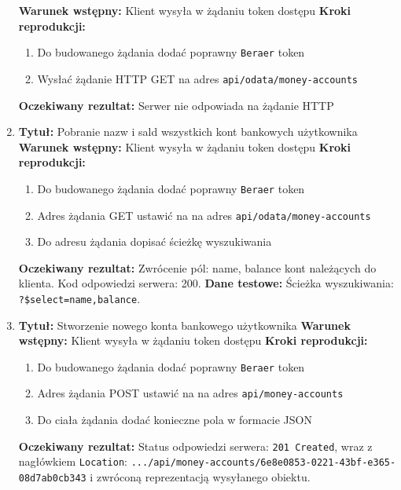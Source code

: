 \begin{enumerate}[labelwidth=1em,label=\Roman*]
    \textbf{Warunek wstępny:} Klient wysyła w żądaniu token dostępu \newline
    \textbf{Kroki reprodukcji:}  \begin{enumerate}[label=\arabic*.]
        \item Do budowanego żądania dodać poprawny \texttt{Beraer} token 
        \item Wysłać żądanie HTTP GET na adres \texttt{api/odata/money-accounts}
    \end{enumerate}
    \textbf{Oczekiwany rezultat:}  Serwer nie odpowiada na żądanie HTTP \newline
\item 
    \textbf{Tytuł:} Pobranie nazw i sald wszystkich kont bankowych użytkownika \newline
    \textbf{Warunek wstępny:} Klient wysyła w żądaniu token dostępu \newline
    \textbf{Kroki reprodukcji:}  \begin{enumerate}[label=\arabic*.]
        \item Do budowanego żądania dodać poprawny \texttt{Beraer} token 
        \item Adres żądania GET ustawić na na adres \texttt{api/odata/money-accounts}
        \item Do adresu żądania dopisać ścieżkę wyszukiwania
    \end{enumerate}
    \textbf{Oczekiwany rezultat:}  Zwrócenie pól: name, balance kont należących do klienta. Kod odpowiedzi serwera: 200. \newline
    \textbf{Dane testowe:} Ścieżka wyszukiwania: \texttt{?\$select=name,balance}.
\item 
    \textbf{Tytuł:} Stworzenie nowego konta bankowego użytkownika \newline
    \textbf{Warunek wstępny:} Klient wysyła w żądaniu token dostępu \newline
    \textbf{Kroki reprodukcji:}  \begin{enumerate}[label=\arabic*.]
        \item Do budowanego żądania dodać poprawny \texttt{Beraer} token 
        \item Adres żądania POST ustawić na na adres \texttt{api/money-accounts}
        \item Do ciała żądania dodać konieczne pola w formacie JSON
    \end{enumerate}
    \textbf{Oczekiwany rezultat:}  Status odpowiedzi serwera: \texttt{201 Created}, wraz z nagłówkiem \texttt{Location}: \texttt{.../api/money-accounts/6e8e0853-0221-43bf-e365-08d7ab0cb343} i zwróconą reprezentacją wysyłanego obiektu. \newline

\end{enumerate}
